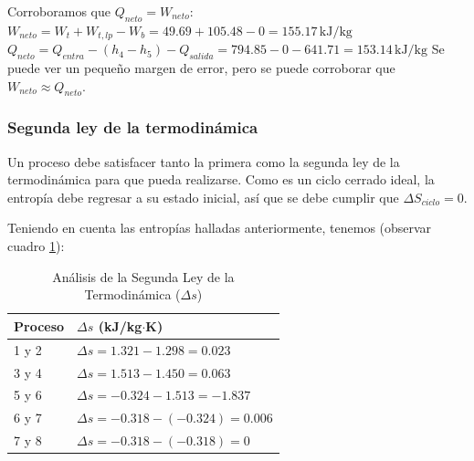 \documentclass[conference]{IEEEtran}
\theoremstyle{mytheoremstyle}
\theoremstyle{mytheoremstyle}
\theoremstyle{myproblemstyle}
\begin{document}
Corroboramos que $Q_{neto} = W_{neto}$:
$W_{neto} = W_t + W_{t,lp} - W_b = 49.69 + 105.48 - 0 = 155.17 \, \text{kJ/kg}$ 
$Q_{neto} = Q_{entra} - (h_4 - h_5) - Q_{salida} = 794.85 - 0 - 641.71 = 153.14 \, \text{kJ/kg}$ 
Se puede ver un pequeño margen de error, pero se puede corroborar que $W_{neto} \approx Q_{neto}$.

\subsubsection*{Segunda ley de la termodinámica}
Un proceso debe satisfacer tanto la primera como la segunda ley de la termodinámica para que pueda realizarse. Como es un ciclo cerrado ideal, la entropía debe regresar a su estado inicial, así que se debe cumplir que $\Delta S_{ciclo} = 0$.

Teniendo en cuenta las entropías halladas anteriormente, tenemos (observar cuadro \ref{tab:segunda_ley}):
\begin{table}[htbp] %
    \centering
    \caption{Análisis de la Segunda Ley de la Termodinámica ($\Delta s$)}
    \begin{tabular}{|l|l|}
    \hline
    \textbf{Proceso} & \textbf{$\Delta s$ (kJ/kg$\cdot$K)} \\
    \hline
    1 y 2 & $\Delta s = 1.321 - 1.298 = 0.023$  \\
    3 y 4 & $\Delta s = 1.513 - 1.450 = 0.063$  \\
    5 y 6 & $\Delta s = -0.324 - 1.513 = -1.837$  \\
    6 y 7 & $\Delta s = -0.318 - (-0.324) = 0.006$  \\
    7 y 8 & $\Delta s = -0.318 - (-0.318) = 0$  \\
    \hline
    \end{tabular}
    \label{tab:segunda_ley}
\end{table}
\end{document}
